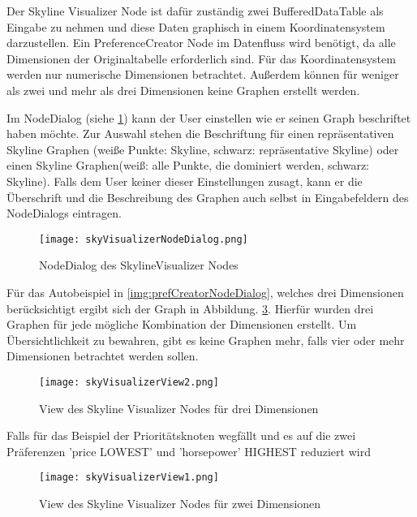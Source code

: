 Der Skyline Visualizer Node ist dafür zuständig zwei BufferedDataTable als Eingabe zu nehmen und diese Daten graphisch in einem Koordinatensystem darzustellen. Ein PreferenceCreator Node im Datenfluss wird benötigt, da alle Dimensionen der Originaltabelle erforderlich sind. Für das Koordinatensystem werden nur numerische Dimensionen betrachtet. Außerdem können für weniger als zwei und mehr als drei Dimensionen keine Graphen erstellt werden.

Im NodeDialog (siehe \ref{img:skyVisualizerNodeDialog}) kann der User einstellen wie er seinen Graph beschriftet haben möchte. Zur Auswahl stehen die Beschriftung für einen repräsentativen Skyline Graphen (weiße Punkte: Skyline, schwarz: repräsentative Skyline) oder einen Skyline Graphen(weiß: alle Punkte, die dominiert werden, schwarz: Skyline). Falls dem User keiner dieser Einstellungen zusagt, kann er die Überschrift und die Beschreibung des Graphen auch selbst in Eingabefeldern des NodeDialogs eintragen.

\begin{figure}[H]
	\centering
	\texttt{[image: skyVisualizerNodeDialog.png]}
	\caption{NodeDialog des SkylineVisualizer Nodes}
	\label{img:skyVisualizerNodeDialog}
\end{figure}

Für das Autobeispiel in \ref{img:prefCreatorNodeDialog}, welches drei Dimensionen berücksichtigt ergibt sich der Graph in Abbildung. \ref{img:skyVisiualizerView1}. Hierfür wurden drei Graphen für jede mögliche Kombination der Dimensionen erstellt. Um Übersichtlichkeit zu bewahren, gibt es keine Graphen mehr, falls vier oder mehr Dimensionen betrachtet werden sollen.

\begin{figure}[H]
	\centering
	\texttt{[image: skyVisualizerView2.png]}
	\caption{View des Skyline Visualizer Nodes für drei Dimensionen}
	\label{img:skyVisiualizerView2}
\end{figure}

Falls für das Beispiel der Prioritätsknoten wegfällt und es auf die zwei Präferenzen 'price LOWEST' und 'horsepower' HIGHEST reduziert wird

\begin{figure}[H]
	\centering
	\texttt{[image: skyVisualizerView1.png]}
	\caption{View des Skyline Visualizer Nodes für zwei Dimensionen}
	\label{img:skyVisiualizerView1}
\end{figure}

